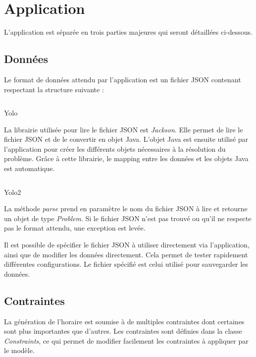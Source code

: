 \section{Application}

L'application est séparée en trois parties majeures qui seront détaillées ci-dessous.

\subsection{Données}
Le format de données attendu par l'application est un fichier JSON contenant respectant la structure suivante :

\begin{listing}[H]
    \inputminted{json}{assets/figures/example.json}
    \caption{Yolo}
\end{listing}


La librairie utilisée pour lire le fichier JSON est \textit{Jackson}. Elle permet de lire le fichier JSON et de le convertir en objet Java. L'objet Java est ensuite utilisé par l'application pour créer les différents objets nécessaires à la résolution du problème. Grâce à cette librairie, le mapping entre les données et les objets Java est automatique.

\begin{listing}[H]
    \inputminted{java}{assets/figures/parser.java}
    \caption{Yolo2}
\end{listing}

La méthode \textit{parse} prend en paramètre le nom du fichier JSON à lire et retourne un objet de type \textit{Problem}. Si le fichier JSON n'est pas trouvé ou qu'il ne respecte pas le format attendu, une exception est levée.

Il est possible de spécifier le fichier JSON à utiliser directement via l'application, ainsi que de modifier les données directement. Cela permet de tester rapidement différentes configurations. Le fichier spécifié est celui utilisé pour sauvegarder les données.

\subsection{Contraintes}

La génération de l'horaire est soumise à de multiples contraintes dont certaines sont plus importantes que d'autres. Les contraintes sont définies dans la classe \textit{Constraints}, ce qui permet de modifier facilement les contraintes à appliquer par le modèle.

